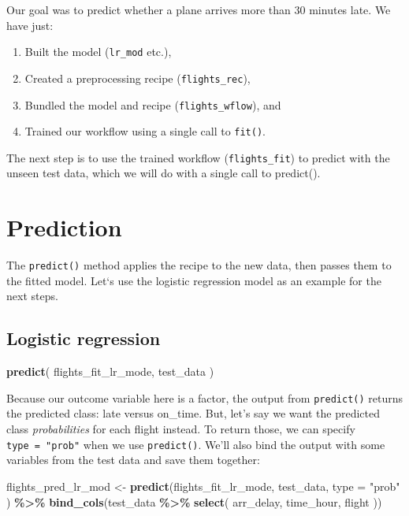 \documentclass[
]{book}
\newenvironment{Shaded}{\begin{snugshade}}{\end{snugshade}}
\newcommand{\DataTypeTok}[1]{\textcolor[rgb]{0.13,0.29,0.53}{#1}}
\newcommand{\KeywordTok}[1]{\textcolor[rgb]{0.13,0.29,0.53}{\textbf{#1}}}
\newcommand{\NormalTok}[1]{#1}
\newcommand{\OperatorTok}[1]{\textcolor[rgb]{0.81,0.36,0.00}{\textbf{#1}}}
\newcommand{\StringTok}[1]{\textcolor[rgb]{0.31,0.60,0.02}{#1}}
\begin{document}
Our goal was to predict whether a plane arrives more than 30 minutes late. We have just:

\begin{enumerate}
\def\labelenumi{\arabic{enumi}.}
\item
  Built the model (\texttt{lr\_mod} etc.),
\item
  Created a preprocessing recipe (\texttt{flights\_rec}),
\item
  Bundled the model and recipe (\texttt{flights\_wflow}), and
\item
  Trained our workflow using a single call to \texttt{fit()}.
\end{enumerate}

The next step is to use the trained workflow (\texttt{flights\_fit}) to predict with the unseen test data, which we will do with a single call to predict().

\hypertarget{prediction}{%
\chapter{Prediction}\label{prediction}}

The \texttt{predict()} method applies the recipe to the new data, then passes them to the fitted model. Let`s use the logistic regression model as an example for the next steps.

\hypertarget{logistic-regression-4}{%
\section{Logistic regression}\label{logistic-regression-4}}

\begin{Shaded}
\begin{Highlighting}[]
\KeywordTok{predict}\NormalTok{(}
\NormalTok{  flights\_fit\_lr\_mode,}
\NormalTok{  test\_data}
\NormalTok{)}
\end{Highlighting}
\end{Shaded}

Because our outcome variable here is a factor, the output from \texttt{predict()} returns the predicted class: late versus on\_time. But, let's say we want the predicted class \emph{probabilities} for each flight instead. To return those, we can specify \texttt{type\ =\ "prob"} when we use \texttt{predict()}. We'll also bind the output with some variables from the test data and save them together:

\begin{Shaded}
\begin{Highlighting}[]
\NormalTok{flights\_pred\_lr\_mod \textless{}{-}}
\StringTok{  }\KeywordTok{predict}\NormalTok{(flights\_fit\_lr\_mode,}
\NormalTok{    test\_data,}
    \DataTypeTok{type =} \StringTok{"prob"}
\NormalTok{  ) }\OperatorTok{\%\textgreater{}\%}
\StringTok{  }\KeywordTok{bind\_cols}\NormalTok{(test\_data }\OperatorTok{\%\textgreater{}\%}
\StringTok{    }\KeywordTok{select}\NormalTok{(}
\NormalTok{      arr\_delay,}
\NormalTok{      time\_hour,}
\NormalTok{      flight}
\NormalTok{    ))}
\end{Highlighting}
\end{Shaded}
\end{document}
